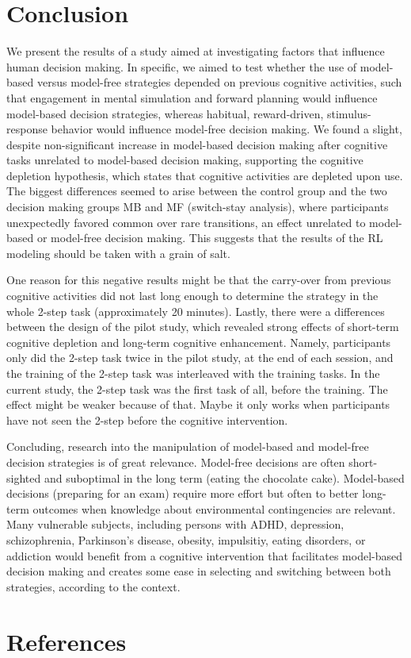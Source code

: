 \documentclass[11pt]{article} %
\begin{document}
\section{Conclusion}
We present the results of a study aimed at investigating factors that influence human decision making. In specific, we aimed to test whether the use of model-based versus model-free strategies depended on previous cognitive activities, such that engagement in mental simulation and forward planning would influence model-based decision strategies, whereas habitual, reward-driven, stimulus-response behavior would influence model-free decision making. We found a slight, despite non-significant increase in model-based decision making after cognitive tasks unrelated to model-based decision making, supporting the cognitive depletion hypothesis, which states that cognitive activities are depleted upon use. The biggest differences seemed to arise between the control group and the two decision making groups MB and MF (switch-stay analysis), where participants unexpectedly favored common over rare transitions, an effect unrelated to model-based or model-free decision making. This suggests that the results of the RL modeling should be taken with a grain of salt.

One reason for this negative results might be that the carry-over from previous cognitive activities did not last long enough to determine the strategy in the whole 2-step task (approximately 20 minutes). Lastly, there were a differences between the design of the pilot study, which revealed strong effects of short-term cognitive depletion and long-term cognitive enhancement. Namely, participants only did the 2-step task twice in the pilot study, at the end of each session, and the training of the 2-step task was interleaved with the training tasks. In the current study, the 2-step task was the first task of all, before the training. The effect might be weaker because of that. Maybe it only works when participants have not seen the 2-step before the cognitive intervention.

Concluding, research into the manipulation of model-based and model-free decision strategies is of great relevance. Model-free decisions are often short-sighted and suboptimal in the long term (eating the chocolate cake). Model-based decisions (preparing for an exam) require more effort but often to better long-term outcomes when knowledge about environmental contingencies are relevant. Many vulnerable subjects, including persons with ADHD, depression, schizophrenia, Parkinson's disease, obesity, impulsitiy, eating disorders, or addiction would benefit from a cognitive intervention that facilitates model-based decision making and creates some ease in selecting and switching between both strategies, according to the context.

\section{References}
\end{document}
